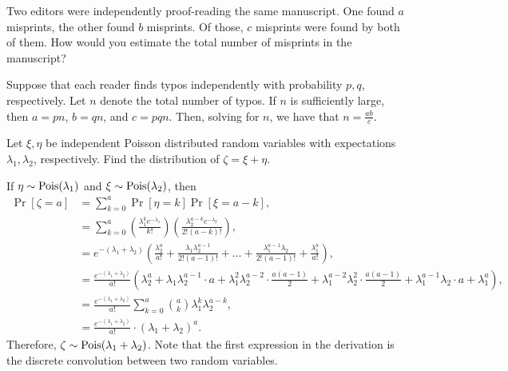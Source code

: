 \begin{problem}{7}

\end{problem}
\begin{solution}
\end{solution}

\begin{problem}{9}
    Two editors were independently proof-reading the same manuscript. One found $a$ misprints, the other found $b$ misprints. Of those, $c$ misprints were found by both of them. How would you estimate the total number of misprints in the manuscript?
\end{problem}
\begin{solution}
    Suppose that each reader finds typos independently with probability $p, q$, respectively. Let $n$ denote the total number of typos. If $n$ is sufficiently large, then $a = pn$, $b = qn$, and $c = pqn$. Then, solving for $n$, we have that $n = \frac{ab}{c}$. 
\end{solution}



\begin{problem}{10}
    Let $\xi,\eta$ be independent Poisson distributed random variables with expectations $\lambda_1,\lambda_2$, respectively. Find the distribution of $\zeta = \xi + \eta$. 
\end{problem}
\begin{solution}
    If $\eta \sim \operatorname{Pois}(\lambda_1)$ and $\xi \sim \operatorname{Pois}(\lambda_2)$, then 
    \begin{align*}
        \Pr[\zeta = a] &= \sum_{k=0}^a \Pr[\eta = k]\Pr[\xi = a - k], \\
        &= \sum_{k=0}^a \left(\frac{\lambda_1^k e^{-\lambda_1}}{k!}\right)\left(\frac{\lambda_2^{a-k}e^{-\lambda_2}}{2!(a-k)!}\right), \\
        &= e^{-(\lambda_1 + \lambda_2)}\left(\frac{\lambda_2^a}{a!} + \frac{\lambda_1\lambda_2^{a-1}}{2!(a-1)!} + \ldots + \frac{\lambda_1^{a-1}\lambda_2}{2!(a-1)!} + \frac{\lambda_1^a}{a!}\right), \\
        &= \frac{e^{-(\lambda_1 + \lambda_2)}}{a!}\left(\lambda_2^a + \lambda_1\lambda_2^{a-1}\cdot a + \lambda_1^2\lambda_2^{a-2} \cdot \frac{a(a-1)}{2} + \lambda_1^{a-2}\lambda_2^2 \cdot \frac{a(a-1)}{2} + \lambda_1^{a-1}\lambda_2 \cdot a + \lambda_1^a\right), \\
        &=  \frac{e^{-(\lambda_1 + \lambda_2)}}{a!} \sum_{k=0}^a \binom{a}{k} \lambda_1^k \lambda_2^{a-k}, \\
        &= \frac{e^{-(\lambda_1 + \lambda_2)}}{a!} \cdot (\lambda_1 + \lambda_2)^a.
    \end{align*}
    Therefore, $\zeta \sim \operatorname{Pois}(\lambda_1 + \lambda_2)$. Note that the first expression in the derivation is the discrete convolution between two random variables. 
\end{solution}

